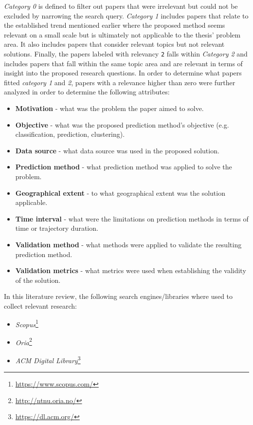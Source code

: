 \textit{Category 0} is defined to filter out papers that were irrelevant but could not be excluded by narrowing the search query. \textit{Category 1} includes papers that relate to the established trend mentioned earlier where the proposed method seems relevant on a small scale but is ultimately not applicable to the thesis' problem area. It also includes papers that consider relevant topics but not relevant solutions. Finally, the papers labeled with relevancy \texttt{2} falls within \textit{Category 2} and includes papers that fall within the same topic area and are relevant in terms of insight into the proposed research questions. In order to determine what papers fitted \textit{category 1} and \textit{2}, papers with a relevance higher than zero were further analyzed in order to determine the following attributes:

\begin{itemize}
    \item \textbf{Motivation} - what was the problem the paper aimed to solve.
    \item \textbf{Objective} - what was the proposed prediction method's objective (e.g. classification, prediction, clustering).
    \item \textbf{Data source} - what data source was used in the proposed solution.
    \item \textbf{Prediction method} - what prediction method was applied to solve the problem.
    \item \textbf{Geographical extent} - to what geographical extent was the solution applicable.
    \item \textbf{Time interval} - what were the limitations on prediction methods in terms of time or trajectory duration.
    \item \textbf{Validation method} - what methods were applied to validate the resulting prediction method.
    \item \textbf{Validation metrics} - what metrics were used when establishing the validity of the solution.
\end{itemize}

In this literature review, the following search engines/libraries where used to collect relevant research:

\begin{itemize}
    \item \textit{Scopus}\footnote{\url{https://www.scopus.com/}}
    \item \textit{Oria}\footnote{\url{http://ntnu.oria.no/}}
    \item \textit{ACM Digital Library}\footnote{\url{https://dl.acm.org/}}
\end{itemize}

